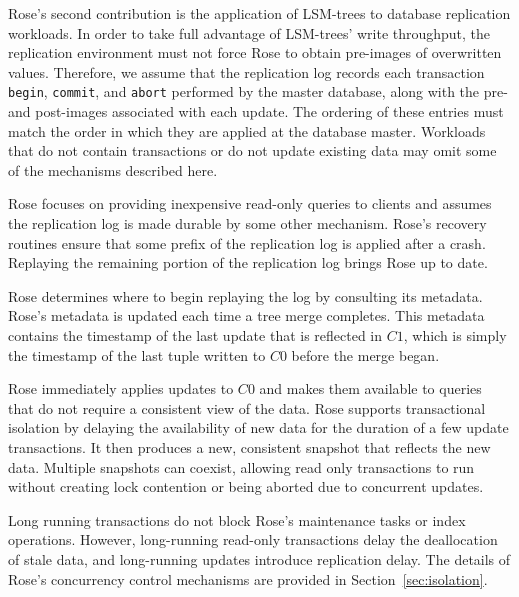 \documentclass{vldb}
\newcommand{\rows}{Rose\xspace}
\newcommand{\rowss}{Rose's\xspace}
\begin{document}
\rowss second contribution is the application of LSM-trees to database
replication workloads.  In order to take full advantage of LSM-trees'
write throughput, the replication environment must not force \rows to
obtain pre-images of overwritten values.  Therefore, we assume that the
replication log records each transaction {\tt begin}, {\tt commit},
and {\tt abort} performed by the master database, along with the pre-
and post-images associated with each update.  The ordering of
these entries must match the order in which they are applied at the
database master.  Workloads that do not contain transactions or do not
update existing data may omit some of the mechanisms described here.

\rows focuses on providing inexpensive read-only queries to clients
and assumes the replication log is made durable by some other
mechanism.  \rowss recovery routines ensure that some prefix of the
replication log is applied after a crash.  Replaying the remaining
portion of the replication log brings \rows up to date.

\rows determines where to begin replaying the log by consulting its
metadata.  \rowss metadata is updated each time a tree merge
completes.  This metadata contains the timestamp of the last update
that is reflected in $C1$, which is simply the timestamp of the
last tuple written to $C0$ before the merge began.

\rows immediately applies updates to $C0$ and makes them
available to queries that do not require a consistent view of the
data.  \rows supports transactional isolation by delaying the
availability of new data for the duration of a few update
transactions.  It then produces a new, consistent snapshot that
reflects the new data.  Multiple snapshots can coexist, allowing read
only transactions to run without creating lock contention or being
aborted due to concurrent updates.

Long running transactions do not block \rowss maintenance tasks or
index operations.  However, long-running read-only transactions delay
the deallocation of stale data, and  long-running updates introduce
replication delay.  The details of \rowss concurrency control
mechanisms are provided in Section~\ref{sec:isolation}.

\end{document}
